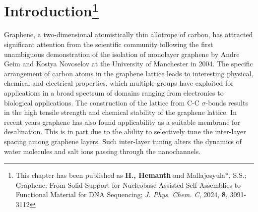 \chapter[Introduction]{Introduction\protect\footnote{This chapter has been published as \textbf{H., Hemanth} and Mallajosyula*, S.S.; Graphene: From Solid Support for Nucleobase Assisted Self-Assemblies to Functional Material for DNA Sequencing; {\textit{J. Phys. Chem. C}, 2024, \textbf{8}, 3091-3112}}}

Graphene, a two-dimensional atomistically thin allotrope of carbon, has attracted significant attention from the scientific community following the first unambiguous demonstration of the isolation of monolayer graphene by Andre Geim and Kostya Novoselov at the University of Manchester in 2004\supercite{geim_rise_2007, geim_graphene_2009}. The specific arrangement of carbon atoms in the graphene lattice leads to interesting physical, chemical and electrical properties, which multiple groups have exploited for applications in a broad spectrum of domains\supercite{berman_few_2013,chen_oxidation_2011, cui_cautionary_2017, su_impermeable_2014, berry_impermeability_2013, hayatdavoudi_mechanistic_2017} ranging from electronics\supercite{moreno_bottom-up_2018, fan_graphene_2019,sun_graphene_2010, kim_graphene-contact_2012, avouris_graphene_2010, baeumer_ferroelectrically_2015, bao_atomic-layer_2009,blake_graphene-based_2008, trung_graphene_2022,wang_transparent_2008, liu_ultratransparent_2017, shin_stretchable_2019,kim_large-scale_2009, polat_graphene_2014, anagnostopoulos_mechanical_2016,bae_roll--roll_2010, khan_graphene_2017} to biological applications\supercite{akinwande_large-area_2015,lalwani_two-dimensional_2013,mohanty_graphene-based_2008,ohno_label-free_2010,chen_electronic_2012,he_graphene_2010}. The construction of the lattice from C-C $\sigma$-bonds results in the high tensile strength and chemical stability of the graphene lattice.\supercite{booth_macroscopic_2008, lee_measurement_2008} In recent years graphene has also found applicability as a suitable membrane for desalination. This is  in part due to the ability to selectively tune the inter-layer spacing among graphene layers. Such inter-layer tuning alters the dynamics of water molecules and salt ions passing through the nanochannels.\supercite{abraham_tunable_2017, nair_unimpeded_2012, gopinadhan_complete_2019, radha_molecular_2016, saini_selective_2022, yang_self-assembly_2018, paechotrattanakul_ultrahigh_2023, gao_confined_2022, gao_graphene_2022}


